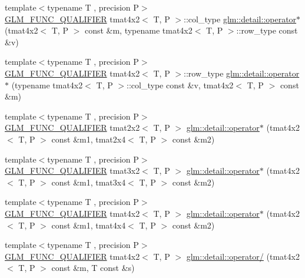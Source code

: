 \begin{DoxyCompactItemize}
\item 
{\footnotesize template$<$typename T , precision P$>$ }\\\hyperlink{setup_8hpp_a33fdea6f91c5f834105f7415e2a64407}{G\+L\+M\+\_\+\+F\+U\+N\+C\+\_\+\+Q\+U\+A\+L\+I\+F\+I\+ER} tmat4x2$<$ T, P $>$\+::col\+\_\+type \hyperlink{namespaceglm_1_1detail_ae86c3519bb53504c913b4e2648248004}{glm\+::detail\+::operator$\ast$} (tmat4x2$<$ T, P $>$ const \&m, typename tmat4x2$<$ T, P $>$\+::row\+\_\+type const \&v)
\item 
{\footnotesize template$<$typename T , precision P$>$ }\\\hyperlink{setup_8hpp_a33fdea6f91c5f834105f7415e2a64407}{G\+L\+M\+\_\+\+F\+U\+N\+C\+\_\+\+Q\+U\+A\+L\+I\+F\+I\+ER} tmat4x2$<$ T, P $>$\+::row\+\_\+type \hyperlink{namespaceglm_1_1detail_a81d6aa7efae7954c5216de13b610d3c8}{glm\+::detail\+::operator$\ast$} (typename tmat4x2$<$ T, P $>$\+::col\+\_\+type const \&v, tmat4x2$<$ T, P $>$ const \&m)
\item 
{\footnotesize template$<$typename T , precision P$>$ }\\\hyperlink{setup_8hpp_a33fdea6f91c5f834105f7415e2a64407}{G\+L\+M\+\_\+\+F\+U\+N\+C\+\_\+\+Q\+U\+A\+L\+I\+F\+I\+ER} tmat2x2$<$ T, P $>$ \hyperlink{namespaceglm_1_1detail_ad3a947ca24bfae9e5cbdfaac6beb95d1}{glm\+::detail\+::operator$\ast$} (tmat4x2$<$ T, P $>$ const \&m1, tmat2x4$<$ T, P $>$ const \&m2)
\item 
{\footnotesize template$<$typename T , precision P$>$ }\\\hyperlink{setup_8hpp_a33fdea6f91c5f834105f7415e2a64407}{G\+L\+M\+\_\+\+F\+U\+N\+C\+\_\+\+Q\+U\+A\+L\+I\+F\+I\+ER} tmat3x2$<$ T, P $>$ \hyperlink{namespaceglm_1_1detail_ace41cae060371a78932c5b5a674a40d4}{glm\+::detail\+::operator$\ast$} (tmat4x2$<$ T, P $>$ const \&m1, tmat3x4$<$ T, P $>$ const \&m2)
\item 
{\footnotesize template$<$typename T , precision P$>$ }\\\hyperlink{setup_8hpp_a33fdea6f91c5f834105f7415e2a64407}{G\+L\+M\+\_\+\+F\+U\+N\+C\+\_\+\+Q\+U\+A\+L\+I\+F\+I\+ER} tmat4x2$<$ T, P $>$ \hyperlink{namespaceglm_1_1detail_ad321590e63214bac70ca8dca6147e4dc}{glm\+::detail\+::operator$\ast$} (tmat4x2$<$ T, P $>$ const \&m1, tmat4x4$<$ T, P $>$ const \&m2)
\item 
{\footnotesize template$<$typename T , precision P$>$ }\\\hyperlink{setup_8hpp_a33fdea6f91c5f834105f7415e2a64407}{G\+L\+M\+\_\+\+F\+U\+N\+C\+\_\+\+Q\+U\+A\+L\+I\+F\+I\+ER} tmat4x2$<$ T, P $>$ \hyperlink{namespaceglm_1_1detail_a8c7f2c229a4050828acaf2c119e3cd79}{glm\+::detail\+::operator/} (tmat4x2$<$ T, P $>$ const \&m, T const \&s)

\end{DoxyCompactItemize}
